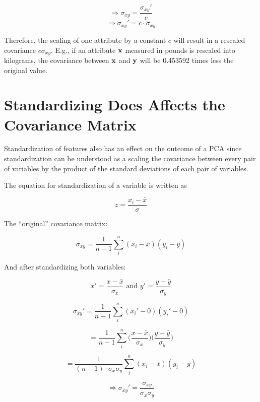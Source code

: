 \documentclass[fleqn]{article}
\begin{document}
\begin{equation} \Rightarrow \sigma_{xy} = \frac{\sigma_{xy}'}{c} \end{equation}
\begin{equation} \Rightarrow \sigma_{xy}' = c \cdot \sigma_{xy} \end{equation}

\noindent Therefore, the scaling of one attribute by a constant $c$ will result in a rescaled covariance $c \sigma_{xy}$. E.g., if an attribute $\bf{x}$ measured in pounds is rescaled  into kilograms, the covariance between $\bf{x}$ and $\bf{y}$ will be 0.453592 times less the original value.



\section{Standardizing Does Affects the Covariance Matrix}
\label{standardizingaffectsthecovariance}

Standardization of features also has an effect on the outcome of a PCA since standardization can be understood as a scaling the covariance between every pair of variables by the product of the standard deviations of each pair of variables.

\noindent The equation for standardization of a variable is written as 

\begin{equation} z = \frac{x_i - \bar{x}}{\sigma} \end{equation}

The ``original'' covariance matrix:

\begin{equation} \sigma_{xy} = \frac{1}{n-1} \sum_{i}^{n} (x_i - \bar{x})(y_i - \bar{y})   \end{equation}

And after standardizing both variables:

\begin{equation} x' = \frac{x - \bar{x}}{\sigma_x} \text{ and } y' =\frac{y - \bar{y}}{\sigma_y} \end{equation}

\begin{equation} \sigma_{xy}' =  \frac{1}{n-1} \sum_{i}^{n} (x_i' - 0)(y_i' - 0)   \end{equation}

\begin{equation}  =  \frac{1}{n-1} \sum_{i}^{n} \bigg(\frac{x - \bar{x}}{\sigma_x}\bigg)\bigg(\frac{y - \bar{y}}{\sigma_y}\bigg)   \end{equation}

\begin{equation}   = \frac{1}{(n-1) \cdot \sigma_x \sigma_y} \sum_{i}^{n} (x_i - \bar{x})(y_i - \bar{y})   \end{equation}

\begin{equation} \Rightarrow \sigma_{xy}' = \frac{\sigma_{xy}}{\sigma_x \sigma_y} \end{equation}
\end{document}
